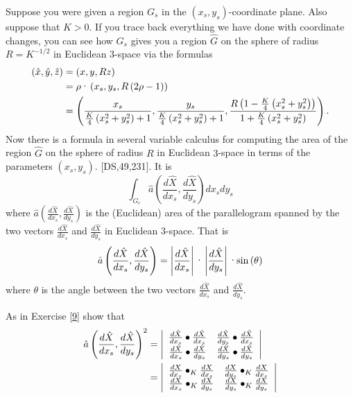 \documentclass{ximera}
\begin{document}
Suppose you were given a region $G_{s}$ in the $\left(  x_{s},y_{s}\right)
$-coordinate plane. Also suppose that $K>0$. If you trace back everything we
have done with coordinate changes, you can see how $G_{s}$ gives you a region
$\hat{G}$ on the sphere of radius $R=K^{-1/2}$ in Euclidean $3$-space via the
formulas%
\begin{align*}
\left(  \hat{x},\hat{y},\hat{z}\right)   &  =\left(  x,y,Rz\right) \\
&  =\rho\text{\textperiodcentered}\left(  x_{s},y_{s},R\left(  2\rho-1\right)
\right) \\
&  =\left(  \frac{x_{s}}{\frac{K}{4}\left(  x_{s}^{2}+y_{s}^{2}\right)
+1},\frac{y_{s}}{\frac{K}{4}\left(  x_{s}^{2}+y_{s}^{2}\right)  +1}%
,\frac{R\left(  1-\frac{K}{4}\left(  x_{s}^{2}+y_{s}^{2}\right)  \right)
}{1+\frac{K}{4}\left(  x_{s}^{2}+y_{s}^{2}\right)  }\right)  .
\end{align*}
Now there is a formula in several variable calculus for computing the area of
the region $\hat{G}$ on the sphere of radius $R$ in Euclidean $3$-space in
terms of the parameters $\left(  x_{s},y_{s}\right)  $. [DS,49,231]. It is
\[%
{\displaystyle\int\nolimits_{G_{c}}}
\hat{a}\left(  \frac{d\hat{X}}{dx_{s}},\frac{d\hat{X}}{dy_{s}}\right)
dx_{s}dy_{s}%
\]
where $\hat{a}\left(  \frac{d\hat{X}}{dx_{s}},\frac{d\hat{X}}{dy_{s}}\right)
$ is the (Euclidean) area of the parallelogram spanned by the two vectors
$\frac{d\hat{X}}{dx_{s}}$ and $\frac{d\hat{X}}{dy_{s}}$ in Euclidean
$3$-space. That is%
\[
\hat{a}\left(  \frac{d\hat{X}}{dx_{s}},\frac{d\hat{X}}{dy_{s}}\right)
=\left\vert \frac{d\hat{X}}{dx_{s}}\right\vert \text{\textperiodcentered
}\left\vert \frac{d\hat{X}}{dy_{s}}\right\vert \text{\textperiodcentered
}\mathrm{sin}\left(  \theta\right)
\]
where $\theta$ is the angle between the two vectors $\frac{d\hat{X}}{dx_{s}}$
and $\frac{d\hat{X}}{dy_{s}}$.

\begin{exercise}
As in Exercise \ref{9} show that%
\begin{align*}
\hat{a}\left(  \frac{d\hat{X}}{dx_{s}},\frac{d\hat{X}}{dy_{s}}\right)  ^{2}
&  =\left\vert
\begin{array}
[c]{cc}%
\frac{d\hat{X}}{dx_{s}}\bullet\frac{d\hat{X}}{dx_{s}} & \frac{d\hat{X}}%
{dy_{s}}\bullet\frac{d\hat{X}}{dx_{s}}\\
\frac{d\hat{X}}{dx_{s}}\bullet\frac{d\hat{X}}{dy_{s}} & \frac{d\hat{X}}%
{dy_{s}}\bullet\frac{d\hat{X}}{dy_{s}}%
\end{array}
\right\vert \\
&  =\left\vert
\begin{array}
[c]{cc}%
\frac{dX}{dx_{s}}\bullet_{K}\frac{dX}{dx_{s}} & \frac{dX}{dy_{s}}\bullet
_{K}\frac{dX}{dx_{s}}\\
\frac{dX}{dx_{s}}\bullet_{K}\frac{dX}{dy_{s}} & \frac{dX}{dy_{s}}\bullet
_{K}\frac{dX}{dy_{s}}%
\end{array}
\right\vert
\end{align*}

\end{exercise}
\end{document}
